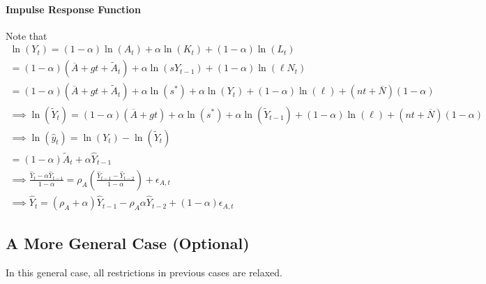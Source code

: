\documentclass[11pt]{article}
\begin{document}
		\paragraph{Impulse Response Function} Note that
		\begin{gather}
			\ln(Y_t) = (1 - \alpha) \ln(A_t) + \alpha \ln (K_t) + (1-\alpha) \ln (L_t) \\
			= (1 - \alpha) (\overline{A} + gt + \tilde{A}_t) + \alpha \ln(s Y_{t-1}) + (1-\alpha) \ln(\ell N_t) \\
			= (1 - \alpha) (\overline{A} + gt + \tilde{A}_t) + \alpha \ln (s^*) + \alpha \ln(Y_t) + (1-\alpha) \ln (\ell) + (nt + \overline{N})(1-\alpha) \\
			\implies \ln(\tilde{Y}_t) = (1-\alpha) (\overline{A} + gt) + \alpha \ln(s^*) + \alpha \ln(\tilde{Y}_{t-1}) + (1-\alpha) \ln(\ell) + (nt + \overline{N})(1-\alpha) \\
			\implies \ln(\hat{y}_t) = \ln(Y_t) - \ln(\tilde{Y}_t) \\
			= (1-\alpha)\tilde{A}_t + \alpha \hat{Y}_{t-1} \\
			\implies \frac{\hat{Y}_t - \alpha \hat{Y}_{t-1}}{1-\alpha} = \rho_A (\frac{\hat{Y}_{t-1} - \hat{Y}_{t-2}}{1-\alpha}) + \epsilon_{A, t} \\
			\implies \hat{Y}_{t} = (\rho_A + \alpha) \hat{Y}_{t-1} - \rho_A \alpha \hat{Y}_{t-2} + (1 - \alpha)\epsilon_{A, t}
		\end{gather}
		
		\subsection{A More General Case (Optional)}
			\begin{assumption}
				In this general case, all restrictions in previous cases are relaxed.
			\end{assumption}
			
\end{document}
